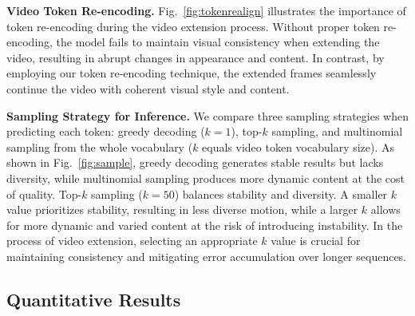 \textbf{Video Token Re-encoding.} Fig.~\ref{fig:tokenrealign} illustrates the importance of token re-encoding during the video extension process.  
Without proper token re-encoding, the model fails to maintain visual consistency when extending the video, resulting in abrupt changes in appearance and content. In contrast, by employing our token re-encoding technique, the extended frames seamlessly continue the video with coherent visual style and content.



\textbf{Sampling Strategy for Inference.}
We compare three sampling strategies when predicting each token: greedy decoding ($k=1$), top-$k$ sampling, and multinomial sampling from the whole vocabulary ($k$ equals video token vocabulary size). As shown in Fig.~\ref{fig:sample}, greedy decoding generates stable results but lacks diversity, while multinomial sampling produces more dynamic content at the cost of quality. Top-$k$ sampling ($k=50$) balances stability and diversity. A smaller $k$ value prioritizes stability, resulting in less diverse motion, while a larger $k$ allows for more dynamic and varied content at the risk of introducing instability. In the process of video extension, selecting an appropriate $k$ value is crucial for maintaining consistency and mitigating error accumulation over longer sequences.
\subsection{Quantitative Results}

\begin{table}[h]
    \centering
    \caption{\textbf{Comparison of zero-shot text-to-short-video generation on the MSRVTT benchmark}}
    \label{tab:short_sota}
    \begin{small}
    \end{small}
    \vskip -0.1in
\end{table}






